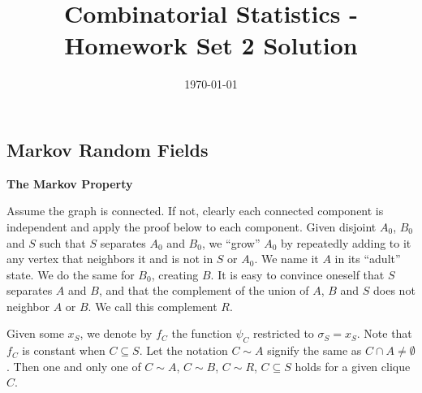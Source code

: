 \documentclass[11pt]{article} \usepackage{amssymb}
\begin{document}
\title{Combinatorial Statistics - Homework Set 2 Solution}

\date{\today}
\maketitle
\subsection{Markov Random Fields}
{\bf The Markov Property}

Assume the graph is connected. If not, clearly each connected component is
independent and apply the proof below to each component.
Given disjoint $A_0$, $B_0$ and $S$ such that $S$ separates $A_0$ and $B_0$,
we ``grow'' $A_0$ by repeatedly adding to it any vertex that neighbors it
and is not in $S$ or $A_0$. We name it $A$ in its ``adult'' state. We do
the same for $B_0$, creating $B$. It is easy to
convince oneself that $S$ separates $A$ and $B$, and that the complement of the 
union of $A$, $B$ and $S$ does not neighbor $A$ or $B$. We call this complement
$R$.

Given some $x_S$, we denote by $f_C$ the function $\psi_C$ restricted
to $\sigma_S=x_S$. Note that $f_C$ is constant when $C\subseteq S$. Let the notation $C\sim A$ 
signify the same as $C\cap A\neq\emptyset$. Then one and only one of $C\sim A$, $C\sim B$,
$C\sim R$, $C\subseteq S$  holds for a given clique $C$.
\end{document}
